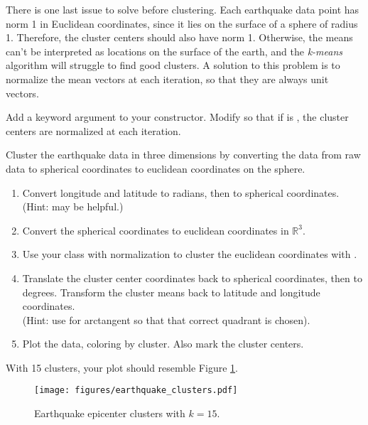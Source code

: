 There is one last issue to solve before clustering.
Each earthquake data point has norm 1 in Euclidean coordinates, since it lies on the surface of a sphere of radius 1.
Therefore, the cluster centers should also have norm 1.
Otherwise, the means can't be interpreted as locations on the surface of the earth, and the \emph{k-means} algorithm will struggle to find good clusters.
A solution to this problem is to normalize the mean vectors at each iteration, so that they are always unit vectors.

\begin{problem}
Add a keyword argument  to your  constructor.
Modify  so that if  is , the cluster centers are normalized at each iteration.

Cluster the earthquake data in three dimensions by converting the data from raw data to spherical coordinates to euclidean coordinates on the sphere.
\begin{enumerate}
\item Convert longitude and latitude to radians, then to spherical coordinates.
\\(Hint:  may be helpful.)
\item Convert the spherical coordinates to euclidean coordinates in $\mathbb{R}^3$.
\item Use your  class with normalization to cluster the euclidean coordinates with .
\item Translate the cluster center coordinates back to spherical coordinates, then to degrees.
Transform the cluster means back to latitude and longitude coordinates.
\\(Hint: use  for arctangent so that that correct quadrant is chosen).
\item Plot the data, coloring by cluster.
Also mark the cluster centers.
\end{enumerate}
With 15 clusters, your plot should resemble Figure \ref{fig:earthquakeclusters}.
\end{problem}

\begin{figure}[H]
    \centering
    \texttt{[image: figures/earthquake\_clusters.pdf]}
    \caption{Earthquake epicenter clusters with $k = 15$.}
    \label{fig:earthquakeclusters}
\end{figure}





